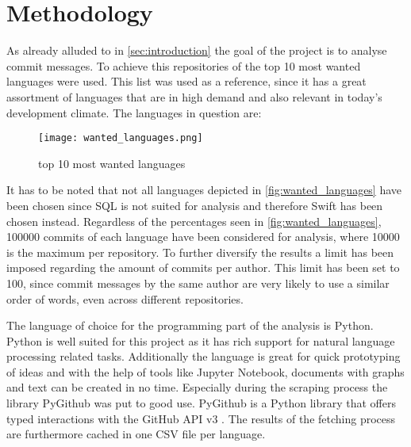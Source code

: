 \section{Methodology}
\label{sec:methodology}

As already alluded to in \autoref{sec:introduction} the goal of the project is to
analyse commit messages. To achieve this repositories of the top 10 most
wanted languages were used. This list was used as a reference, since it
has a great assortment of languages that are in high demand and also relevant
in today's development climate. The languages in question are:

\begin{figure}[H]
  \centering
  \texttt{[image: wanted\_languages.png]}
  \caption{top 10 most wanted languages \cite{so-survey}}
  \label{fig:wanted_languages}
\end{figure}

It has to be noted that not all languages depicted in
\autoref{fig:wanted_languages} have been chosen since SQL is not suited for
analysis and therefore Swift has been chosen instead. Regardless of the
percentages seen in \autoref{fig:wanted_languages}, 100000 commits of each
language have been considered for analysis, where 10000 is the maximum per
repository. To further diversify the results a limit has been imposed regarding
the amount of commits per author. This limit has been set to 100, since commit
messages by the same author are very likely to use a similar order of words,
even across different repositories.

The language of choice for the programming part of the analysis
is Python. Python is well suited for this project as it has rich support for
natural language processing related tasks. Additionally the language is great
for quick prototyping of ideas and with the help of tools like Jupyter
Notebook, documents with graphs and text can be created in no time. Especially
during the scraping process the library PyGithub was put to good use. PyGithub
is a Python library that offers typed interactions with the GitHub API v3
\cite{pygithub}. The results of the fetching process are furthermore cached in
one CSV file per language.

